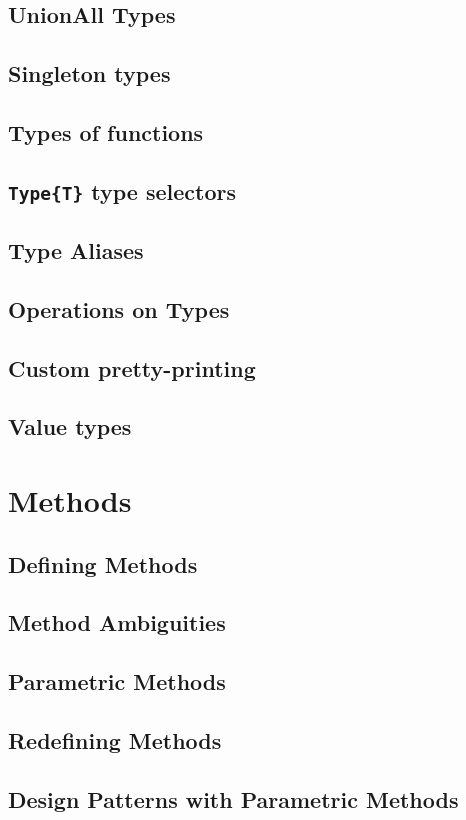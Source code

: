     \section{UnionAll Types}
    \section{Singleton types}
    \section{Types of functions}
    \section{\texttt{Type\{T\}} type selectors}
    \section{Type Aliases}
    \section{Operations on Types}
    \section{Custom pretty-printing}
    \section{{\textquotedbl}Value types{\textquotedbl}}
  \chapter{Methods}
    \section{Defining Methods}
    \section{Method Ambiguities}
    \section{Parametric Methods}
    \section{Redefining Methods}
    \section{Design Patterns with Parametric Methods}
